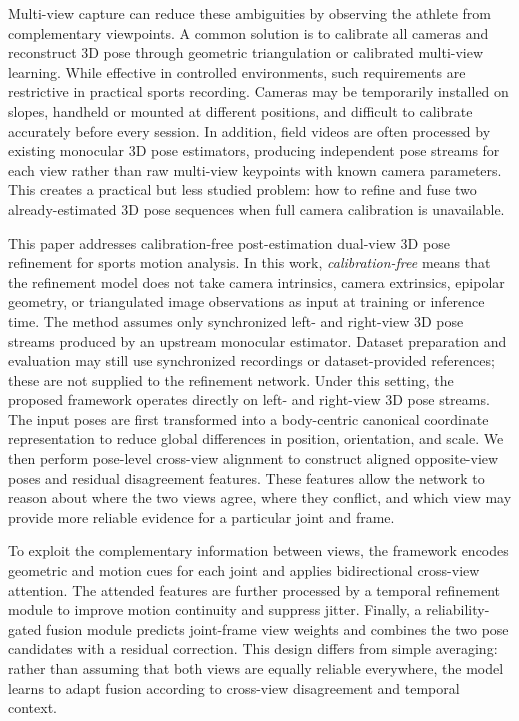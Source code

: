 \documentclass[sigconf,screen]{acmart}
\begin{document}
Multi-view capture can reduce these ambiguities by observing the athlete from complementary viewpoints. A common solution is to calibrate all cameras and reconstruct 3D pose through geometric triangulation or calibrated multi-view learning. While effective in controlled environments, such requirements are restrictive in practical sports recording. Cameras may be temporarily installed on slopes, handheld or mounted at different positions, and difficult to calibrate accurately before every session. In addition, field videos are often processed by existing monocular 3D pose estimators, producing independent pose streams for each view rather than raw multi-view keypoints with known camera parameters. This creates a practical but less studied problem: how to refine and fuse two already-estimated 3D pose sequences when full camera calibration is unavailable.

This paper addresses calibration-free post-estimation dual-view 3D pose refinement for sports motion analysis. In this work, \textit{calibration-free} means that the refinement model does not take camera intrinsics, camera extrinsics, epipolar geometry, or triangulated image observations as input at training or inference time. The method assumes only synchronized left- and right-view 3D pose streams produced by an upstream monocular estimator. Dataset preparation and evaluation may still use synchronized recordings or dataset-provided references; these are not supplied to the refinement network. Under this setting, the proposed framework operates directly on left- and right-view 3D pose streams. The input poses are first transformed into a body-centric canonical coordinate representation to reduce global differences in position, orientation, and scale. We then perform pose-level cross-view alignment to construct aligned opposite-view poses and residual disagreement features. These features allow the network to reason about where the two views agree, where they conflict, and which view may provide more reliable evidence for a particular joint and frame.

To exploit the complementary information between views, the framework encodes geometric and motion cues for each joint and applies bidirectional cross-view attention. The attended features are further processed by a temporal refinement module to improve motion continuity and suppress jitter. Finally, a reliability-gated fusion module predicts joint-frame view weights and combines the two pose candidates with a residual correction. This design differs from simple averaging: rather than assuming that both views are equally reliable everywhere, the model learns to adapt fusion according to cross-view disagreement and temporal context.
\end{document}
